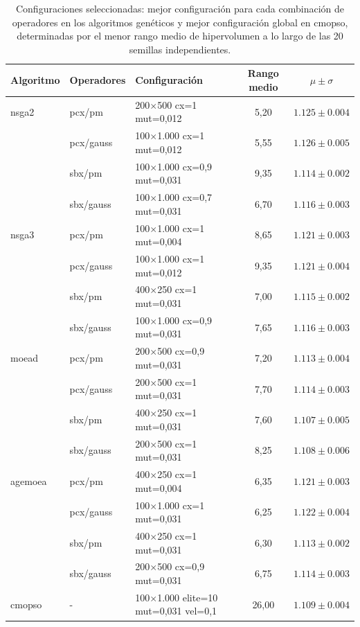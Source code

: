 \begin{table}[H]
\centering
\caption{Configuraciones seleccionadas: mejor configuración para cada combinación de operadores en los algoritmos genéticos y mejor configuración global en \acrshort{cmopso}, determinadas por el menor rango medio de hipervolumen a lo largo de las 20 semillas independientes.}
\label{tab:hp_seleccionadas}
\begin{tabular}{lllcc}
\toprule
Algoritmo & Operadores & Configuración & Rango medio & $\mu \pm \sigma$ \\
\midrule
\acrshort{nsga2} & pcx/pm & 200$\times$500 cx=1 mut=0,012 & 5,20 & $1.125 \pm 0.004$ \\
 & pcx/gauss & 100$\times$1.000 cx=1 mut=0,012 & 5,55 & $1.126 \pm 0.005$ \\
 & sbx/pm & 100$\times$1.000 cx=0,9 mut=0,031 & 9,35 & $1.114 \pm 0.002$ \\
 & sbx/gauss & 100$\times$1.000 cx=0,7 mut=0,031 & 6,70 & $1.116 \pm 0.003$ \\
\midrule
\acrshort{nsga3} & pcx/pm & 100$\times$1.000 cx=1 mut=0,004 & 8,65 & $1.121 \pm 0.003$ \\
 & pcx/gauss & 100$\times$1.000 cx=1 mut=0,012 & 9,35 & $1.121 \pm 0.004$ \\
 & sbx/pm & 400$\times$250 cx=1 mut=0,031 & 7,00 & $1.115 \pm 0.002$ \\
 & sbx/gauss & 100$\times$1.000 cx=0,9 mut=0,031 & 7,65 & $1.116 \pm 0.003$ \\
\midrule
\acrshort{moead} & pcx/pm & 200$\times$500 cx=0,9 mut=0,031 & 7,20 & $1.113 \pm 0.004$ \\
 & pcx/gauss & 200$\times$500 cx=1 mut=0,031 & 7,70 & $1.114 \pm 0.003$ \\
 & sbx/pm & 400$\times$250 cx=1 mut=0,031 & 7,60 & $1.107 \pm 0.005$ \\
 & sbx/gauss & 200$\times$500 cx=1 mut=0,031 & 8,25 & $1.108 \pm 0.006$ \\
\midrule
\acrshort{agemoea} & pcx/pm & 400$\times$250 cx=1 mut=0,004 & 6,35 & $1.121 \pm 0.003$ \\
 & pcx/gauss & 100$\times$1.000 cx=1 mut=0,031 & 6,25 & $1.122 \pm 0.004$ \\
 & sbx/pm & 400$\times$250 cx=1 mut=0,031 & 6,30 & $1.113 \pm 0.002$ \\
 & sbx/gauss & 200$\times$500 cx=0,9 mut=0,031 & 6,75 & $1.114 \pm 0.003$ \\
\midrule
\acrshort{cmopso} & - & 100$\times$1.000 elite=10 mut=0,031 vel=0,1 & 26,00 & $1.109 \pm 0.004$ \\
\bottomrule
\end{tabular}
\end{table}


